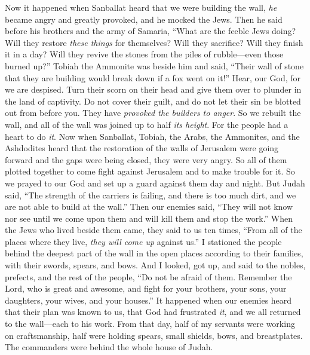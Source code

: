 \begin{biblechapter} %
  Now it happened when Sanballat heard that we were building the wall, \textit{he} became angry and greatly provoked, and he mocked the Jews.
\verse Then he said before his brothers and the army of Samaria, “What are the feeble Jews doing? Will they restore \textit{these things} for themselves? Will they sacrifice? Will they finish it in a day? Will they revive the stones from the piles of rubble—even those burned up?”
\verse Tobiah the Ammonite was beside him and said, “Their wall of stone that they are building would break down if a fox went on it!”
\verse Hear, our God, for we are despised. Turn their scorn on their head and give them over to plunder in the land of captivity.
\verse Do not cover their guilt, and do not let their sin be blotted out from before you. They have \textit{provoked the builders to anger}.
\verse So we rebuilt the wall, and all of the wall was joined up to half \textit{its height}. For the people had a heart to do \textit{it}.
 Now when Sanballat, Tobiah, the Arabs, the Ammonites, and the Ashdodites heard that the restoration of the walls of Jerusalem were going forward and the gaps were being closed, they were very angry.
\verse So all of them plotted together to come fight against Jerusalem and to make trouble for it.
\verse So we prayed to our God and set up a guard against them day and night.
\verse But Judah said, “The strength of the carriers is failing, and there is too much dirt, and we are not able to build at the wall.”
\verse Then our enemies said, “They will not know nor see until we come upon them and will kill them and stop the work.”
\verse When the Jews who lived beside them came, they said to us ten times, “From all of the places where they live, \textit{they will come up} against us.”
\verse I stationed the people behind the deepest part of the wall in the open places according to their families, with their swords, spears, and bows.
\verse And I looked, got up, and said to the nobles, prefects, and the rest of the people, “Do not be afraid of them. Remember the Lord, who is great and awesome, and fight for your brothers, your sons, your daughters, your wives, and your houses.”
\verse It happened when our enemies heard that their plan was known to us, that God had frustrated \textit{it}, and we all returned to the wall—each to his work.
\verse From that day, half of my servants were working on craftsmanship, half were holding spears, small shields, bows, and breastplates. The commanders were behind the whole house of Judah.

\end{biblechapter}
